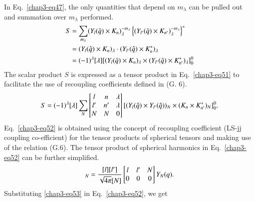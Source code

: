 In Eq.\ \eqref{chap3-eq47}, the only quantities that depend on $m_\lambda$ can be pulled out and summation over $m_\lambda$ performed.
\begin{align}
  S & = \sum_{m_\lambda} (Y_l ({\boldmath \hat{q}}) \times {\boldmath K}_n)_\lambda^{-m_\lambda}
  \left\{ (Y_{l'} ({\boldmath \hat{q}}) \times {\boldmath K}_{n'})_\lambda^{-m_\lambda}\right\}^\ast \notag \\
  & = (Y_l ({\boldmath \hat{q}}) \times {\boldmath K}_n)_\lambda \cdot (Y_{l'}({\boldmath \hat{q}}) \times {\boldmath K}_n^\ast)_\lambda \notag\\
  & = (-1)^\lambda [\lambda] [(Y_l ({\boldmath \hat{q}}) \times  {\boldmath K}_n)_\lambda \times (Y_{l'}({\boldmath \hat{q}}) \times {\boldmath K}_{n'}^{\ast})_\lambda ]_0^0 \label{chap3-eq51}
\end{align}
The scalar product $S$ is expressed as a tensor product in Eq.\ \eqref{chap3-eq51} to facilitate the use of recoupling coefficients defined in (G. 6).
\begin{equation}
  S= (-1)^\lambda [\lambda] \sum_{N} \begin{bmatrix} l & n & \lambda \\ l' & n' & \lambda\\ N & N & 0\end{bmatrix}
    [(Y_l ({\boldmath \hat{q}}) \times Y_{l'}({\boldmath \hat{q}}))_N \times ({\boldmath K}_n \times {\boldmath K}_{n'}^\ast)_N]_0^0. \label{chap3-eq52}
\end{equation}
Eq.\ \eqref{chap3-eq52} is obtained using the concept of recoupling coefficient (LS-jj coupling co-efficient) for the tensor products of spherical tensors and making use of the relation (G.6). The tensor product of spherical harmonics in Eq.\ \eqref{chap3-eq52} can be further simplified.
\begin{equation}
  [Y_l({\boldmath \hat{q}}) \times Y_{l'}({\boldmath \hat{q}})]_N = \frac{[l][l']}{\sqrt{4\pi}[N]}
  \begin{bmatrix}l & l' & N\\ 0 & 0 & 0  \end{bmatrix} Y_N ({\boldmath q}). \label{chap3-eq53}
\end{equation}
Substituting \eqref{chap3-eq53} in Eq.\ \eqref{chap3-eq52}, we get
